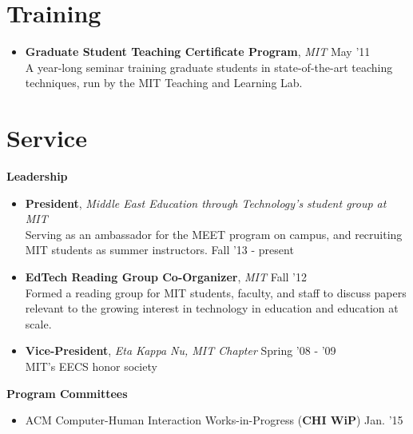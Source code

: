 \documentclass[margin]{res}
\begin{document}
\begin{resume}
\section{Training}
\begin{itemize}[leftmargin=*]
\item {\bf Graduate Student Teaching Certificate Program}, {\it MIT} \hfill May '11 \\ A year-long seminar training graduate students in state-of-the-art teaching techniques, run by the MIT Teaching and Learning Lab.
\end{itemize}

\section{Service}
{\bf Leadership}
                \begin{itemize}[leftmargin=*] %
                \item {\bf President}, {\it Middle East Education through Technology's student group at MIT} \\ Serving as an ambassador for the MEET program on campus, and recruiting MIT students as summer instructors. \hfill Fall '13 - present
		\item {\bf EdTech Reading Group Co-Organizer}, {\it MIT} \hfill Fall '12 \\ Formed a reading group for MIT students, faculty, and staff to discuss papers relevant to the growing interest in technology in education and education at scale.
                \item {\bf Vice-President}, {\it Eta Kappa Nu, MIT Chapter} \hfill Spring '08 - '09 \\ MIT's EECS honor society 
\end{itemize}

{\bf Program Committees}
 \begin{itemize}[leftmargin=*]
\item ACM Computer-Human Interaction Works-in-Progress ({\bf CHI WiP}) \hfill Jan. '15
\end{itemize}


\end{resume}
\end{document}
